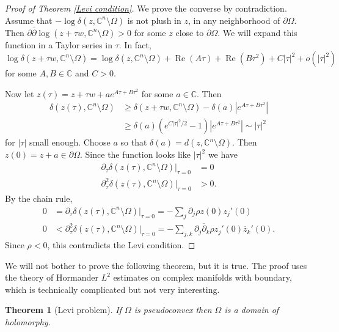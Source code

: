 \documentclass[12pt]{report}
\newcommand{\CC}{\mathbb{C}}
\newcommand{\dbar}{\overline \partial}
\renewcommand{\Re}{\operatorname{Re}}
\newtheorem{theorem}{Theorem}[chapter]
\theoremstyle{definition}
\begin{document}
\begin{proof}[Proof of Theorem \ref{Levi condition}]
    We prove the converse by contradiction. Assume that $-\log \delta(z, \CC^n \setminus \Omega)$ is not plush in $z$, in any neighborhood of $\partial \Omega$. Then $\partial \dbar \log(z + \tau w, \CC^n \setminus \Omega) > 0$ for some $z$ close to $\partial \Omega$. We will expand this function in a Taylor series in $\tau$. In fact,
    $$\log \delta(z + \tau w, \CC^n \setminus \Omega) = \log \delta(z, \CC^n \setminus \Omega) + \Re (A \tau) + \Re (B \tau^2) + C|\tau|^2 + o(|\tau|^2)$$
    for some $A, B \in \CC$ and $C > 0$.

    Now let $z(\tau) = z + \tau w + ae^{A\tau + B\tau^2}$ for some $a \in \CC$. Then
\begin{align*}
    \delta(z(\tau), \CC^n \setminus \Omega) &\geq \delta(z + \tau w, \CC^n \setminus \Omega) - \delta(a)|e^{A\tau + B\tau^2}|\\
    &\geq \delta(a) (e^{C|\tau|^2/2} - 1)|e^{A\tau + B\tau^2}| \sim |\tau|^2
\end{align*}
    for $|\tau|$ small enough. Choose $a$ so that $\delta(a) = d(z, \CC^n \setminus \Omega)$. Then $z(0) = z + a \in \partial \Omega$. Since the function looks like $|\tau|^2$ we have
\begin{align*}\partial_\tau \delta(z(\tau), \CC^n \setminus \Omega)|_{\tau = 0} &= 0\\
\partial_\tau^2 \delta(z(\tau), \CC^n \setminus \Omega)|_{\tau = 0} &> 0.
\end{align*}
    By the chain rule,
\begin{align*}
    0 &= \partial_\tau \delta(z(\tau), \CC^n \setminus \Omega)|_{\tau = 0} = -\sum_j \partial_j \rho z(0) z_j'(0)\\
    0 &< \partial_\tau^2 \delta(z(\tau), \CC^n \setminus \Omega)|_{\tau = 0} = -\sum_{j,k} \partial_j \dbar_k \rho z_j'(0) \overline z_k'(0).
\end{align*}
    Since $\rho < 0$, this contradicts the Levi condition.
\end{proof}
    We will not bother to prove the following theorem, but it is true. The proof uses the theory of Hormander $L^2$ estimates on complex manifolds with boundary, which is technically complicated but not very interesting.
\begin{theorem}[Levi problem]
    If $\Omega$ is pseudoconvex then $\Omega$ is a domain of holomorphy.
\end{theorem}
\end{document}
